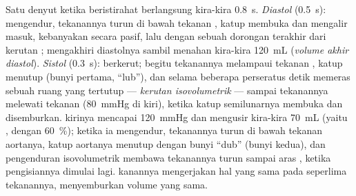 \begin{proposition}\label{prop:b2:heart:cycle}
Satu denyut ketika beristirahat berlangsung kira-kira \qty{0.8}{s}.
\emph{Diastol} (\qty{0.5}{s}):  mengendur, tekanannya turun di
bawah tekanan , katup  membuka dan 
mengalir masuk, kebanyakan secara pasif, lalu dengan sebuah dorongan
terakhir dari kerutan ;  mengakhiri diastolnya sambil
menahan kira-kira \qty{120}{mL} (\emph{volume akhir diastol}).
\emph{Sistol} (\qty{0.3}{s}):  berkerut; begitu tekanannya
melampaui tekanan , katup  menutup (bunyi
 pertama, ``lub''), dan selama beberapa perseratus detik
 memeras sebuah ruang yang tertutup --- \emph{kerutan
isovolumetrik} --- sampai tekanannya melewati tekanan 
(\qty{80}{mmHg} di kiri), ketika katup semilunarnya membuka dan
 disemburkan.  kirinya mencapai \qty{120}{mmHg} dan
mengusir kira-kira \qty{70}{mL} (yaitu \emph{},
dengan \emph{} \qty{60}{\%}); ketika ia mengendur,
tekanannya turun di bawah tekanan aortanya, katup aortanya menutup
dengan bunyi ``dub'' (bunyi kedua), dan pengenduran isovolumetrik
membawa tekanannya turun sampai aras , ketika pengisiannya
dimulai lagi.  kanannya mengerjakan hal yang sama pada
seperlima tekanannya, menyemburkan volume yang sama.
\end{proposition}

